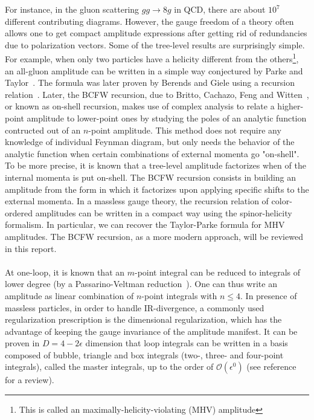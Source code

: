 For instance, in the gluon scattering $gg\rightarrow 8g$ in QCD, there are about $10^7$ different contributing diagrams.
However, the gauge freedom of a theory often allows one to get compact amplitude expressions after getting rid of redundancies due to polarization vectors.
Some of the tree-level results are surprisingly simple.
For example, when only two particles have a helicity different from the others\footnote{This is called an maximally-helicity-violating (MHV) amplitude}, an all-gluon amplitude can be written in a simple way conjectured by Parke and Taylor~\cite{PhysRevLett.56.2459}.
%
The formula was later proven by Berends and Giele using a recursion relation~\cite{BERENDS1988759,KOSOWER199023}.
Later, the BCFW recursion, due to Britto, Cachazo, Feng and Witten~\cite{BRITTO2005499, PhysRevLett.94.181602}, or known as on-shell recursion, makes use of complex analysis to relate a higher-point amplitude to lower-point ones by studying the poles of an analytic function contructed out of an $n$-point amplitude.
This method does not require any knowledge of individual Feynman diagram, but only needs the behavior of the analytic function when certain combinations of external momenta go "on-shell". 
%
To be more precise, it is known that a tree-level amplitude factorizes when of the internal momenta is put on-shell.
%
The BCFW recursion consists in building an amplitude from the form in which it factorizes upon applying specific shifts to the external momenta.
%
In a massless gauge theory, the recursion relation of color-ordered amplitudes can be written in a compact way using the spinor-helicity formalism.
%
In particular, we can recover the Taylor-Parke formula for MHV amplitudes.
The BCFW recursion, as a more modern approach, will be reviewed in this report.
\\\\
At one-loop,
it is known that an $m$-point integral can be reduced to integrals of lower degree (\eg by a Passarino-Veltman reduction~\cite{PASSARINO1979151}). 
One can thus write an amplitude as linear combination of $n$-point integrals with $n\leq 4$.
In presence of massless particles, in order to handle IR-divergence, a commonly used regularization prescription is the dimensional regularization, which has the advantage of keeping the gauge invariance of the amplitude manifest.
It can be proven in $D = 4-2\epsilon$ dimension that loop integrals can be written in a basis composed of bubble, triangle and box integrals (\ie two-, three- and four-point integrals), called the master integrals, up to the order of $\mathcal{O}(\epsilon^0)$ (see \eg reference~\cite{Gluza:2010ws} for a review).
